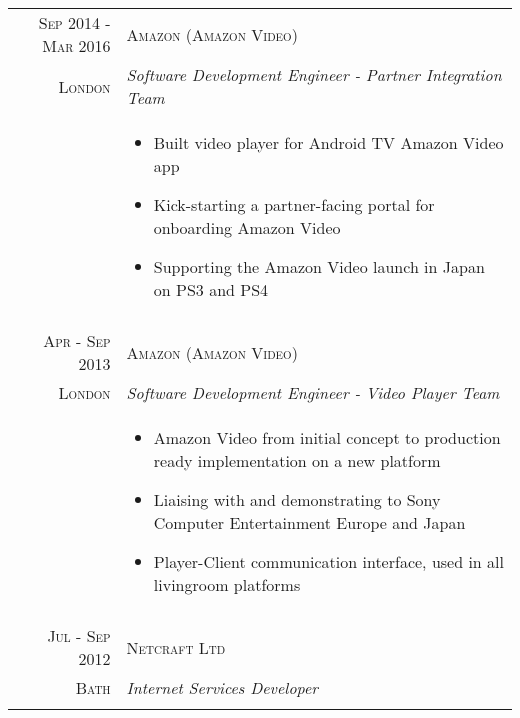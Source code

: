 \begin{tabular}{r|p{11cm}}
\textsc{Sep 2014 - Mar 2016} & \textsc{Amazon (Amazon Video)}\\
\textsc{London} & \emph{Software Development Engineer - Partner Integration Team}\\
& \begin{footnotesize}
\begin{itemize}
	\vspace*{-\baselineskip}
	\item Built video player for Android TV Amazon Video app
	\item Kick-starting a partner-facing portal for onboarding Amazon Video
	\item Supporting the Amazon Video launch in Japan on PS3 and PS4
	\vspace*{-\baselineskip}
\end{itemize}
\end{footnotesize}\\

\multicolumn{2}{c}{} \\

\textsc{Apr - Sep 2013} & \textsc{Amazon (Amazon Video)}\\
\textsc{London} & \emph{Software Development Engineer - Video Player Team}\\
& \begin{footnotesize}
\begin{itemize}
	\vspace*{-\baselineskip}
	\item Amazon Video from initial concept to production ready implementation on a new platform
	\item Liaising with and demonstrating to Sony Computer Entertainment Europe and Japan
	\item Player-Client communication interface, used in all livingroom platforms
	\vspace*{-\baselineskip}
\end{itemize}
\end{footnotesize}\\

\multicolumn{2}{c}{} \\


\textsc{Jul - Sep 2012} & \textsc{Netcraft Ltd}\\ 
\textsc{Bath} & \emph{Internet Services Developer}\\

\multicolumn{2}{c}{} \\


\end{tabular}
